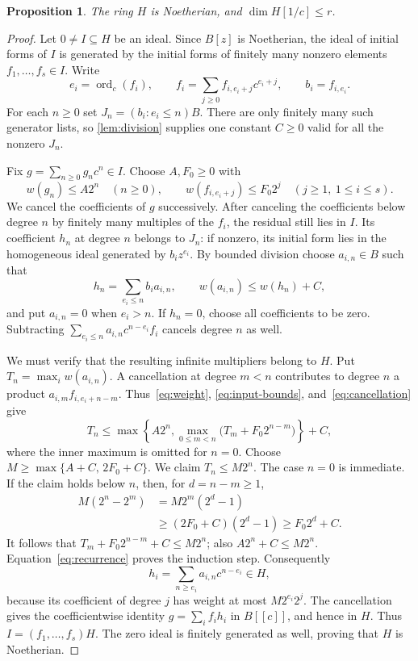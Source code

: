 \documentclass[11pt,reqno]{amsart}
\numberwithin{equation}{section}
\theoremstyle{plain}
\newtheorem{proposition}[theorem]{Proposition}
\theoremstyle{definition}
\theoremstyle{remark}
\DeclareMathOperator{\ord}{ord}
\begin{document}
\begin{proposition}\label{prop:noetherian}
The ring $H$ is Noetherian, and $\dim H[1/c]\le r$.
\end{proposition}

\begin{proof}
Let $0\ne I\subseteq H$ be an ideal. Since $B[z]$ is Noetherian,
the ideal of initial forms of $I$ is generated by the initial forms
of finitely many nonzero elements $f_1,\ldots,f_s\in I$. Write
\[
 e_i=\ord_c(f_i),\qquad
 f_i=\sum_{j\ge0}f_{i,e_i+j}c^{e_i+j},\qquad b_i=f_{i,e_i}.
\]
For each $n\ge0$ set $J_n=(b_i:e_i\le n)B$.
There are only finitely many such generator lists, so
\cref{lem:division} supplies one constant $C\ge0$ valid for
all the nonzero $J_n$.

Fix $g=\sum_{n\ge0}g_nc^n\in I$. Choose $A,F_0\ge0$ with
\begin{equation}\label{eq:input-bounds}
 w(g_n)\le A2^n\quad(n\ge0),\qquad
 w(f_{i,e_i+j})\le F_0 2^j\quad(j\ge1,\ 1\le i\le s).
\end{equation}
We cancel the coefficients of $g$ successively. After canceling
the coefficients below degree $n$ by finitely many multiples of
the $f_i$, the residual still lies in $I$. Its coefficient $h_n$
at degree $n$ belongs to $J_n$: if nonzero, its initial form lies
in the homogeneous ideal generated by $b_i z^{e_i}$.
By bounded division choose $a_{i,n}\in B$ such that
\begin{equation}\label{eq:cancellation}
 h_n=\sum_{e_i\le n}b_i a_{i,n},\qquad
 w(a_{i,n})\le w(h_n)+C,
\end{equation}
and put $a_{i,n}=0$ when $e_i>n$.
If $h_n=0$, choose all coefficients to be zero.
Subtracting $\sum_{e_i\le n}a_{i,n}c^{n-e_i}f_i$ cancels
degree $n$ as well.

We must verify that the resulting infinite multipliers belong to
$H$. Put $T_n=\max_i w(a_{i,n})$. A cancellation at degree
$m<n$ contributes to degree $n$ a product
$a_{i,m}f_{i,e_i+n-m}$. Thus~\eqref{eq:weight},
\eqref{eq:input-bounds}, and~\eqref{eq:cancellation} give
\begin{equation}\label{eq:recurrence}
 T_n\le\max\left\{A2^n,
       \max_{0\le m<n}\bigl(T_m+F_0 2^{n-m}\bigr)\right\}+C,
\end{equation}
where the inner maximum is omitted for $n=0$.
Choose $M\ge\max\{A+C,\,2F_0+C\}$.
We claim $T_n\le M2^n$. The case $n=0$ is immediate.
If the claim holds below $n$, then, for $d=n-m\ge1$,
\begin{align*}
 M(2^n-2^m)
 &=M2^m(2^d-1)\\
 &\ge(2F_0+C)(2^d-1)\ge F_0 2^d+C.
\end{align*}
It follows that $T_m+F_0 2^{n-m}+C\le M2^n$; also
$A2^n+C\le M2^n$. Equation~\eqref{eq:recurrence} proves
the induction step. Consequently
\[
 h_i=\sum_{n\ge e_i}a_{i,n}c^{n-e_i}\in H,
\]
because its coefficient of degree $j$ has weight at most
$M2^{e_i}2^j$. The cancellation gives the coefficientwise identity
$g=\sum_i f_i h_i$ in $B[[c]]$, and hence in $H$.
Thus $I=(f_1,\ldots,f_s)H$. The zero ideal is finitely generated
as well, proving that $H$ is Noetherian.


\end{proof}
\end{document}
